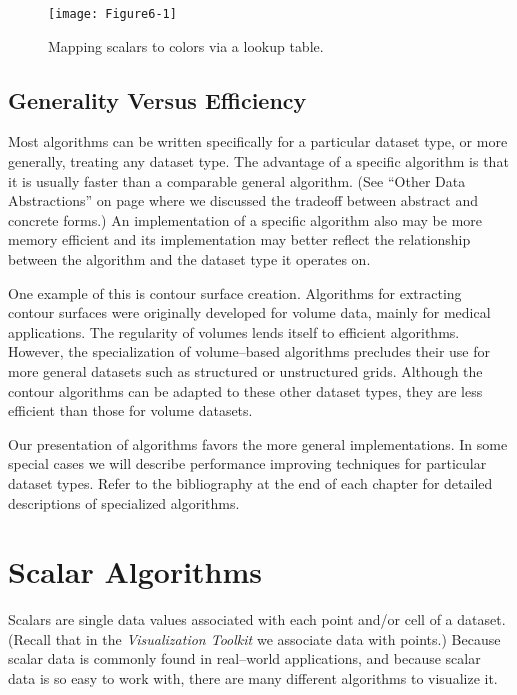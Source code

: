 \begin{figure}[!htb]
	\centering
	\texttt{[image: Figure6-1]}\\
	\caption{Mapping scalars to colors via a lookup table.}\label{fig:Figure6-1}
\end{figure}

\subsection{Generality Versus Efficiency}
\label{subsec:benerality_vs_efficiency}

Most algorithms can be written specifically for a particular dataset type, or more generally, treating any dataset type. The advantage of a specific algorithm is that it is usually faster than a comparable general algorithm. (See ``Other Data Abstractions'' on page \pageref{sec:other_data_abstractions} where we discussed the tradeoff between abstract and concrete forms.) An implementation of a specific algorithm also may be more memory efficient and its implementation may better reflect the relationship between the algorithm and the dataset type it operates on.

One example of this is contour surface creation. Algorithms for extracting contour surfaces were originally developed for volume data, mainly for medical applications. The regularity of volumes lends itself to efficient algorithms. However, the specialization of volume--based algorithms precludes their use for more general datasets such as structured or unstructured grids. Although the contour algorithms can be adapted to these other dataset types, they are less efficient than those for volume datasets.

Our presentation of algorithms favors the more general implementations. In some special cases we will describe performance improving techniques for particular dataset types. Refer to the bibliography at the end of each chapter for detailed descriptions of specialized algorithms.

\section{Scalar Algorithms}

Scalars are single data values associated with each point and/or cell of a dataset. (Recall that in the \emph{Visualization Toolkit} we associate data with points.) Because scalar data is commonly found in real--world applications, and because scalar data is so easy to work with, there are many different algorithms to visualize it.

